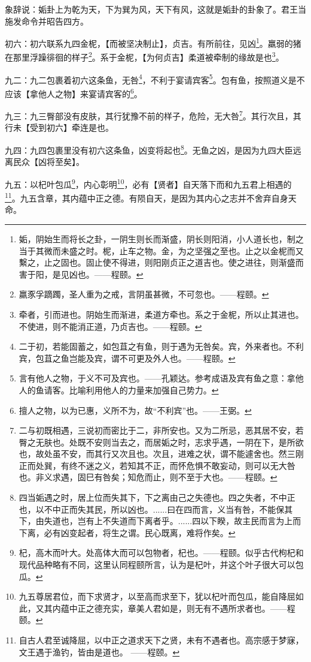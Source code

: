 \documentclass[12pt,oneside]{book}
\begin{document}
象辞说：姤卦上为乾为天，下为巽为风，天下有风，这就是姤卦的卦象了。君王当施发命令并昭告四方。

初六：初六联系九四金柅，【而被坚决制止】，贞吉。有所前往，见凶\footnote{姤，阴始生而将长之卦，一阴生则长而渐盛，阴长则阳消，小人道长也，制之当于其微而未盛之时。柅，止车之物。金，为之坚强之至也。止之以金柅而又繫之，止之固也。固止使不得进，则阳刚贞正之道吉也。使之进往，则渐盛而害于阳，是见凶也。——程颐。}。羸弱的猪在那里浮躁徘徊的样子\footnote{羸豕孚蹢躅，圣人重为之戒，言阴虽甚微，不可忽也。——程颐。}。系于金柅，【为何贞吉】柔道被牵制的缘故是也\footnote{牵者，引而进也。阴始生而渐进，柔道方牵也。系之于金柅，所以止其进也。不使进，则不能消正道，乃贞吉也。——程颐。}。

九二：九二包裹着初六这条鱼，无咎\footnote{二于初，若能固蓄之，如包苴之有鱼，则于遇为无咎矣。宾，外来者也。不利宾，包苴之鱼岂能及宾，谓不可更及外人也。——程颐。}，不利于宴请宾客\footnote{言有他人之物，于义不可及宾也。——孔颖达。参考成语及宾有鱼之意：拿他人的鱼请客。比喻利用他人的力量来加强自己势力。}。包有鱼，按照道义是不应该【拿他人之物】来宴请宾客的\footnote{擅人之物，以为已惠，义所不为，故“不利宾”也。——王弼。}。

九三：九三臀部没有皮肤，其行犹豫不前的样子，危险，无大咎\footnote{二与初既相遇，三说初而密比于二，非所安也。又为二所忌，恶其居不安，若臀之无肤也。处既不安则当去之，而居姤之时，志求乎遇，一阴在下，是所欲也，故处虽不安，而其行又次且也。次且，进难之状，谓不能遽舍也。然三刚正而处巽，有终不迷之义，若知其不正，而怀危惧不敢妄动，则可以无大咎也。非义求遇，固巳有咎矣；知危而止，则不至于大也。——程颐。}。其行次且，其行未【受到初六】牵连是也。

九四：九四包裹里没有初六这条鱼，凶变将起也\footnote{四当姤遇之时，居上位而失其下，下之离由己之失德也。四之失者，不中正也，以不中正而失其民，所以凶也。......曰在四而言，义当有咎，不能保其下，由失道也，岂有上不失道而下离者乎。......四以下睽，故主民而言为上而下离，必有凶变起者，将生之谓。民心既离，难将作矣。}。无鱼之凶，是因为九四大臣远离民众【凶将至矣】。

九五：以杞叶包瓜\footnote{杞，高木而叶大。处高体大而可以包物者，杞也。——程颐。似乎古代枸杞和现代品种略有不同，这里认同程颐所言，认为是杞叶，并这个叶子很大可以包瓜。}，内心彰明\footnote{九五尊居君位，而下求贤才，以至高而求至下，犹以杞叶而包瓜，能自降屈如此，又其内蕴中正之德充实，章美人君如是，则无有不遇所求者也。——程颐。}，必有【贤者】自天落下而和九五君上相遇的\footnote{自古人君至诚降屈，以中正之道求天下之贤，未有不遇者也。高宗感于梦寐，文王遇于渔钓，皆由是道也。 ——程颐。}。九五含章，其内蕴中正之德。有陨自天，是因为其内心之志并不舍弃自身天命。
\end{document}
